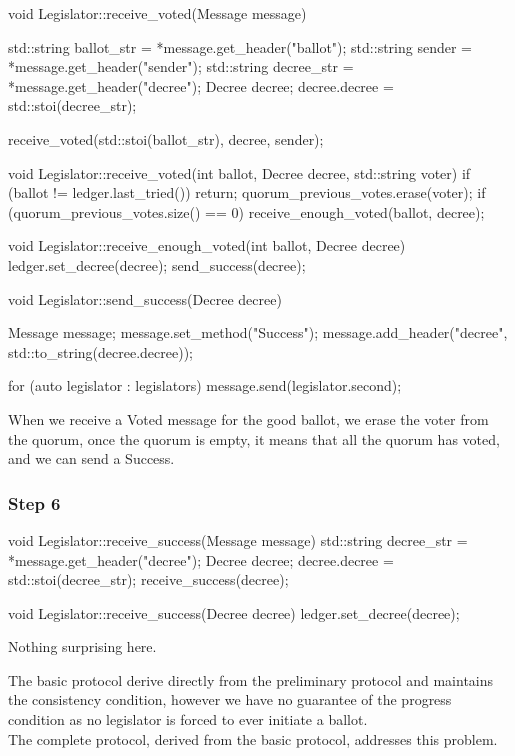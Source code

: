 \documentclass{article}
\begin{document}
\begin{code}
void Legislator::receive_voted(Message message)
{
    std::string ballot_str = *message.get_header("ballot");
    std::string sender = *message.get_header("sender");
    std::string decree_str = *message.get_header("decree");
    Decree decree;
    decree.decree = std::stoi(decree_str);

    receive_voted(std::stoi(ballot_str), decree, sender);
}

void Legislator::receive_voted(int ballot, Decree decree, std::string voter)
{
    if (ballot != ledger.last_tried())
        return;
    quorum_previous_votes.erase(voter);
    if (quorum_previous_votes.size() == 0)
        receive_enough_voted(ballot, decree);
}

void Legislator::receive_enough_voted(int ballot, Decree decree)
{
    ledger.set_decree(decree);
    send_success(decree);
}

void Legislator::send_success(Decree decree)
{
    Message message;
    message.set_method("Success");
    message.add_header("decree", std::to_string(decree.decree));

    for (auto legislator : legislators)
        message.send(legislator.second);
}
\end{code}
When we receive a Voted message for the good ballot, we erase the voter from the quorum, once the quorum is empty, it means that all the quorum has voted, and we can send a Success.

\pagebreak
\subsubsection{Step 6}

\begin{code}
void Legislator::receive_success(Message message)
{
    std::string decree_str = *message.get_header("decree");
    Decree decree;
    decree.decree = std::stoi(decree_str);
    receive_success(decree);
}

void Legislator::receive_success(Decree decree)
{
    ledger.set_decree(decree);
}
\end{code}
Nothing surprising here.

The basic protocol derive directly from the preliminary protocol and maintains the consistency condition, however we have no guarantee of the progress condition as no legislator is forced to ever initiate a ballot.\\
The complete protocol, derived from the basic protocol, addresses this problem.
\end{document}
